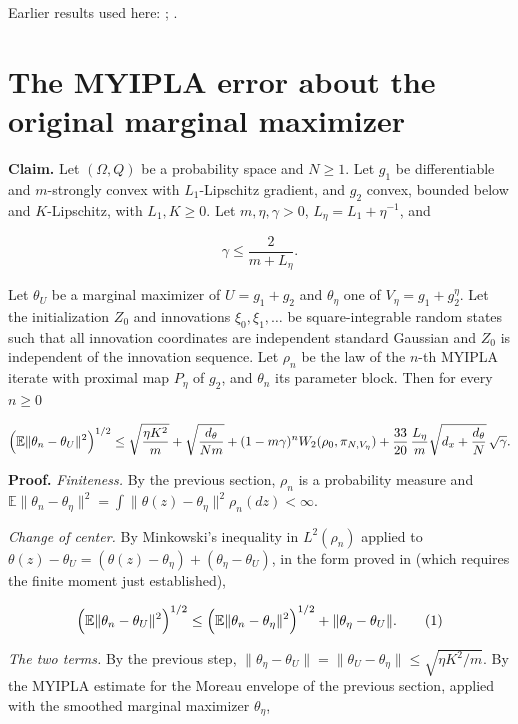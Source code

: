 \documentclass[11pt,a4paper]{article}
\begin{document}
Earlier results used here: \cite[Section~3.1.1]{LangevinLean2026IPLA}; \cite[Section~3.3.1]{LangevinLean2026IPLA}.

\section{\texorpdfstring{The MYIPLA error about the original marginal maximizer}{The MYIPLA error about the original marginal maximizer}}


\textbf{Claim.} Let \((\Omega,Q)\) be a probability space and \(N\ge1\). Let \(g_1\) be differentiable and \(m\)-strongly convex with \(L_1\)-Lipschitz gradient, and \(g_2\) convex, bounded below and \(K\)-Lipschitz, with \(L_1,K\ge0\). Let \(m,\eta,\gamma>0\), \(L_\eta=L_1+\eta^{-1}\), and


\[\gamma\le\frac{2}{m+L_\eta}.\]


Let \(\theta_U\) be a marginal maximizer of \(U=g_1+g_2\) and \(\theta_\eta\) one of \(V_\eta=g_1+g_2^\eta\). Let the initialization \(Z_0\) and innovations \(\xi_0,\xi_1,\dots\) be square-integrable random states such that all innovation coordinates are independent standard Gaussian and \(Z_0\) is independent of the innovation sequence. Let \(\rho_n\) be the law of the \(n\)-th MYIPLA iterate with proximal map \(P_\eta\) of \(g_2\), and \(\theta_n\) its parameter block. Then for every \(n\ge0\)


\[\Bigl(\mathbb E\|\theta_n-\theta_U\|^2\Bigr)^{1/2}\le\sqrt{\frac{\eta K^2}{m}}+\sqrt{\frac{d_\theta}{Nm}}+(1-m\gamma)^nW_2(\rho_0,\pi_{N,V_\eta})+\frac{33}{20}\,\frac{L_\eta}{m}\sqrt{d_x+\frac{d_\theta}N}\,\sqrt\gamma .\]


\textbf{Proof.} \emph{Finiteness.} By the previous section, \(\rho_n\) is a probability measure and \(\mathbb E\|\theta_n-\theta_\eta\|^2=\int\|\theta(z)-\theta_\eta\|^2\rho_n(dz)<\infty\).




\emph{Change of center.} By Minkowski's inequality in \(L^2(\rho_n)\) applied to \(\theta(z)-\theta_U=(\theta(z)-\theta_\eta)+(\theta_\eta-\theta_U)\), in the form proved in \cite[Section~3.8.2]{LangevinLean2026Proximal} (which requires the finite moment just established),


\[\Bigl(\mathbb E\|\theta_n-\theta_U\|^2\Bigr)^{1/2}\le\Bigl(\mathbb E\|\theta_n-\theta_\eta\|^2\Bigr)^{1/2}+\|\theta_\eta-\theta_U\|.\qquad(1)\]


\emph{The two terms.} By the previous step, \(\|\theta_\eta-\theta_U\|=\|\theta_U-\theta_\eta\|\le\sqrt{\eta K^2/m}\). By the MYIPLA estimate for the Moreau envelope of the previous section, applied with the smoothed marginal maximizer \(\theta_\eta\),
\end{document}
